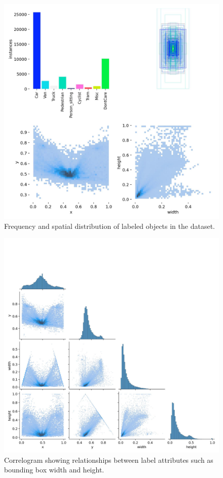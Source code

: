 \documentclass[12pt]{article}
\begin{document}
\begin{figure}[h]
    \centering
    \includegraphics[width=\textwidth]{images/labels.jpg}
    \caption{Frequency and spatial distribution of labeled objects in the dataset.}
    \label{fig:label_distribution}
\end{figure}

\begin{figure}[h]
    \centering
    \includegraphics[width=\textwidth]{images/labels_correlogram.jpg}
    \caption{Correlogram showing relationships between label attributes such as bounding box width and height.}
    \label{fig:label_correlogram}
\end{figure}
\end{document}
